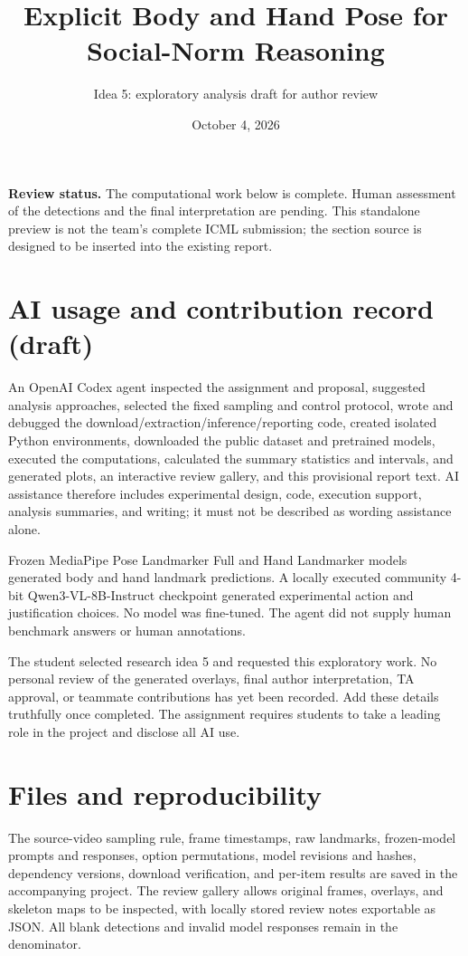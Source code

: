 \documentclass[10pt,twocolumn]{article}
\title{Explicit Body and Hand Pose for Social-Norm Reasoning}
\author{Idea 5: exploratory analysis draft for author review}
\date{October 4, 2026}
\begin{document}
\maketitle
\noindent\textbf{Review status.} The computational work below is complete. Human assessment of the detections and the final interpretation are pending. This standalone preview is not the team's complete ICML submission; the section source is designed to be inserted into the existing report.



\clearpage
\onecolumn
\section*{AI usage and contribution record (draft)}
An OpenAI Codex agent inspected the assignment and proposal, suggested analysis approaches, selected the fixed sampling and control protocol, wrote and debugged the download/extraction/inference/reporting code, created isolated Python environments, downloaded the public dataset and pretrained models, executed the computations, calculated the summary statistics and intervals, and generated plots, an interactive review gallery, and this provisional report text. AI assistance therefore includes experimental design, code, execution support, analysis summaries, and writing; it must not be described as wording assistance alone.

Frozen MediaPipe Pose Landmarker Full and Hand Landmarker models generated body and hand landmark predictions. A locally executed community 4-bit Qwen3-VL-8B-Instruct checkpoint generated experimental action and justification choices. No model was fine-tuned. The agent did not supply human benchmark answers or human annotations.

The student selected research idea 5 and requested this exploratory work. No personal review of the generated overlays, final author interpretation, TA approval, or teammate contributions has yet been recorded. Add these details truthfully once completed. The assignment requires students to take a leading role in the project and disclose all AI use.

\section*{Files and reproducibility}
The source-video sampling rule, frame timestamps, raw landmarks, frozen-model prompts and responses, option permutations, model revisions and hashes, dependency versions, download verification, and per-item results are saved in the accompanying project. The review gallery allows original frames, overlays, and skeleton maps to be inspected, with locally stored review notes exportable as JSON. All blank detections and invalid model responses remain in the denominator.
\end{document}
